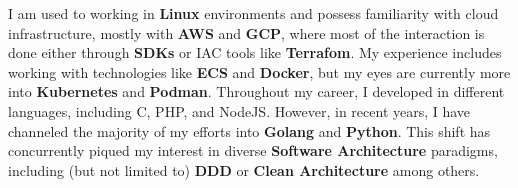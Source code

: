 

%
\begin{cventries}

  \cventry
  {}
  {}
  {}
  {}
  { I am used to working in \textbf{Linux} environments and possess familiarity with cloud infrastructure, mostly with \textbf{AWS} and \textbf{GCP}, where most of the interaction is done either through \textbf{SDKs} or IAC tools like \textbf{Terrafom}. My experience includes working with technologies like \textbf{ECS} and \textbf{Docker}, but my eyes are currently more into \textbf{Kubernetes} and \textbf{Podman}. Throughout my career, I developed in different languages, including C, PHP, and NodeJS. However, in recent years, I have channeled the majority of my efforts into \textbf{Golang} and \textbf{Python}. This shift has concurrently piqued my interest in diverse \textbf{Software Architecture} paradigms, including (but not limited to) \textbf{DDD} or \textbf{Clean Architecture} among others. }
\end{cventries}
